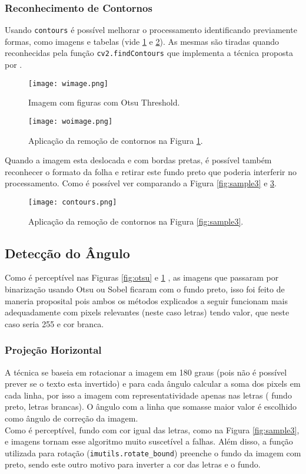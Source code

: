 \documentclass[10pt,twocolumn,letterpaper]{article}
\begin{document}
\subsubsection*{Reconhecimento de Contornos}
Usando \texttt{contours} é possível melhorar o processamento identificando previamente formas, como imagens e tabelas (vide \ref{fig:com_figura} e \ref{fig:sem_figura}). As mesmas são tiradas quando reconhecidas pela função \texttt{cv2.findContours} que implementa a técnica proposta por \cite{Suzuki85}.\\
\begin{figure}
    \centering
    \texttt{[image: wimage.png]}
    \caption{Imagem com figuras com Otsu Threshold.\label{fig:com_figura}}
\end{figure}
\begin{figure}
    \centering
    \texttt{[image: woimage.png]}
    \caption{Aplicação da remoção de contornos na Figura \ref{fig:com_figura}.\label{fig:sem_figura}}
\end{figure}
Quando a imagem esta deslocada e com bordas pretas, é possível também reconhecer o formato da folha e retirar este fundo preto que poderia interferir no processamento. Como é possível ver comparando a Figura \ref{fig:sample3} e \ref{fig:contours}.\\
\begin{figure}
    \centering
    \texttt{[image: contours.png]}
    \caption{Aplicação da remoção de contornos na Figura \ref{fig:sample3}.\label{fig:contours}}
\end{figure}

\subsection{Detecção do Ângulo}
Como é perceptível nas Figuras \ref{fig:otsu} e \ref{fig:com_figura} , as imagens que passaram por binarização usando Otsu ou Sobel ficaram com o fundo preto, isso foi feito de maneria proposital pois ambos os métodos explicados a seguir funcionam mais adequadamente com pixels relevantes (neste caso letras) tendo valor, que neste caso seria 255 e cor branca.
\subsubsection*{Projeção Horizontal}
A técnica se baseia em rotacionar a imagem em 180 graus (pois não é possível prever se o texto esta invertido) e para cada ângulo calcular a soma dos pixels em cada linha, por isso a imagem com representatividade apenas nas letras ( fundo preto, letras brancas). O ângulo com  a linha que somasse maior valor é escolhido como ângulo de correção da imagem.\\
Como é perceptível, fundo com cor igual das letras, como na Figura \ref{fig:sample3}, e imagens tornam esse algoritmo muito suscetível a falhas. Além disso, a função utilizada para rotação (\texttt{imutils.rotate\_bound}) preenche o fundo da imagem com preto, sendo este outro motivo para inverter a cor das letras e o fundo.\\
\end{document}
